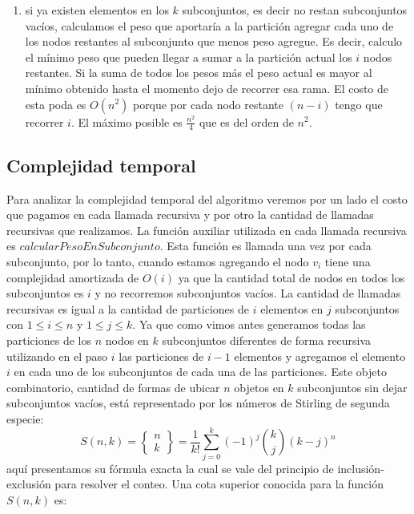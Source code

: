 \begin{enumerate}
  \item si ya existen elementos en los $k$ subconjuntos, es decir no restan subconjuntos vacíos,
    calculamos el peso que aportaría a la partición agregar cada uno de los nodos restantes al 
    subconjunto que menos peso agregue. Es decir, calculo el mínimo peso
    que pueden llegar a sumar a la partición actual los $i$ nodos restantes. Si la suma de todos los pesos 
    más el peso actual es mayor al mínimo obtenido hasta el momento dejo de recorrer esa rama. El costo 
    de esta poda es $O(n^2)$ porque por cada nodo restante $(n-i)$ tengo que recorrer $i$. El máximo posible
    es $\frac{n^2}{4}$ que es del orden de $n^2$. 
\end{enumerate}

\subsection{Complejidad temporal}
Para analizar la complejidad temporal del algoritmo veremos por un lado el costo que pagamos en cada llamada recursiva
y por otro la cantidad de llamadas recursivas que realizamos. La función auxiliar utilizada en cada llamada recursiva
es $calcularPesoEnSubconjunto$. Esta función es llamada una vez por cada subconjunto, por lo tanto,
cuando estamos agregando el nodo $v_i$ tiene una complejidad amortizada de $O(i)$ ya que la cantidad
total de nodos en todos los subconjuntos es $i$ y no recorremos subconjuntos vacíos. La cantidad de llamadas recursivas
es igual a la cantidad de particiones de $i$ elementos en $j$ subconjuntos con $1 \leq i \leq n$ y $1 \leq j \leq k$. Ya que
como vimos antes generamos todas las particiones de los $n$ nodos en $k$ subconjuntos diferentes de forma recursiva
utilizando en el paso $i$ las particiones de $i-1$ elementos y agregamos el elemento $i$ en cada uno de los subconjuntos
de cada una de las particiones. Este objeto combinatorio, cantidad de formas de ubicar $n$ objetos en $k$ subconjuntos
sin dejar subconjuntos vacíos, está representado por los números de Stirling de segunda especie:
\begin{displaymath}
  S(n, k) = \left\{\begin{matrix} n \\ k \end{matrix}\right\} = \frac{1}{k!}\sum_{j=0}^k (-1)^{j}{k \choose j} (k-j)^n
\end{displaymath}
aquí presentamos su fórmula exacta la cual se vale del principio de inclusión-exclusión para resolver el conteo.
Una cota superior conocida para la función $S(n ,k)$ es:
